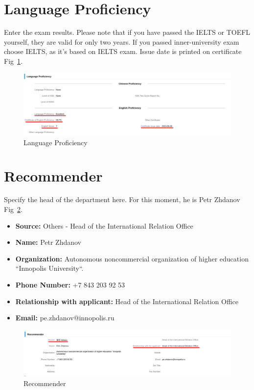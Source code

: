 \section{Language Proficiency}
Enter the exam results.
Please note that if you have passed the IELTS or TOEFL yourself,
they are valid for only two years.
If you passed inner-university exam choose IELTS, as it's based on IELTS exam.
Issue date is printed on certificate Fig~\ref{fig:ru_lang_prof}.


\begin{figure}[H]
    \centering
    \includegraphics[width=\textwidth]{russia/imgs/app_5_language}
    \caption{\centering Language Proficiency}
    \label{fig:ru_lang_prof}
\end{figure}









\section{Recommender}
Specify the head of the department here.
For this moment, he is Petr Zhdanov Fig~\ref{fig:ru_recommender}.

\begin{itemize}
    \item \textbf{Source:} Others - Head of the International Relation Office
    \item \textbf{Name:} Petr Zhdanov
    \item \textbf{Organization:} Autonomous noncommercial organization of higher education ``Innopolis University``.
    \item \textbf{Phone Number:} +7 843 203 92 53
    \item \textbf{Relationship with applicant:} Head of the International Relation Office
    \item \textbf{Email:} pe.zhdanov@innopolis.ru
\end{itemize}


\begin{figure}[H]
    \centering
    \includegraphics[width=\textwidth]{russia/imgs/app_6_recommender}
    \caption{\centering Recommender}
    \label{fig:ru_recommender}
\end{figure}







